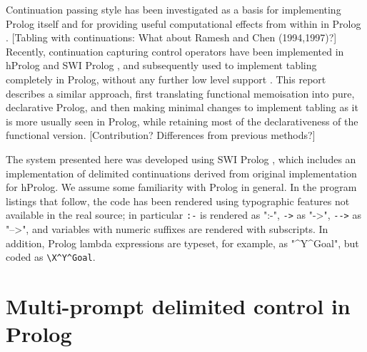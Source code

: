 Continuation passing style has been investigated as a basis for implementing Prolog itself
\citep{TarauDahl1994,Lindgren1994,Neumerkel1995} and for providing useful computational effects
from within in Prolog \citep{TrauDahl1994a,TarauDahl1998}. 
[Tabling with continuations: \cite{De-GuzmanCarroHermenegildo2008,GuzmanCarroHermenegildo2008}
What about Ramesh and Chen (1994,1997)?]
Recently, continuation capturing control operators have been implemented in hProlog and
SWI Prolog \citep{SchrijversDemoenDesouter2013}, and subsequently used to implement
tabling completely in Prolog, without any further low level support 
\cite{DesouterVan-DoorenSchrijvers2015}. This report describes a similar approach, first
translating  functional memoisation into pure, declarative Prolog,
and then making minimal changes to implement tabling as it is more usually seen in Prolog,
while retaining most of the declarativeness of the functional version. [Contribution? Differences from
previous methods?]

The system presented here was developed using SWI Prolog \citep{WielemakerSchrijversTriska2012},
which includes an implementation of delimited continuations
derived from  original implementation for hProlog.
We assume some familiarity with Prolog in general. In the program listings that follow, the code
has been rendered using typographic features not available in the real source; in particular
\verb|:-| is rendered as ":-", \verb|->| as "->", \verb|-->| as "-->", and variables with numeric suffixes
are rendered with subscripts. In addition, Prolog lambda expressions \citep{Neumerkel2009} are typeset, for example,
as "\X^Y^Goal", but coded as \verb|\X^Y^Goal|.

\section{Multi-prompt delimited control in Prolog}


